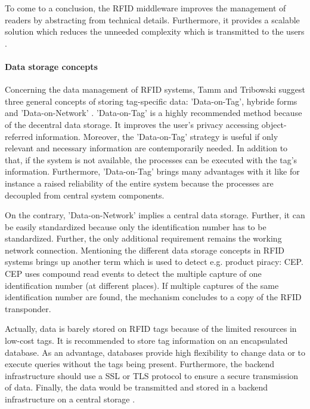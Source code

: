 To come to a conclusion, the RFID middleware improves the management of readers by abstracting from technical details. Furthermore, it provides a scalable solution which reduces the unneeded complexity which is transmitted to the users \cite[p.20 ff.]{fokus}.   

\paragraph{Data storage concepts}

Concerning the data management of RFID systems, Tamm and Tribowski suggest three general concepts of storing tag-specific data: 'Data-on-Tag', hybride forms and 'Data-on-Network' \cite[p.22 ff.]{fokus}. 'Data-on-Tag' is a highly recommended method because of the decentral data storage. It improves the user's privacy accessing object-referred information. Moreover, the 'Data-on-Tag' strategy is useful if only relevant and necessary information are contemporarily needed. In addition to that, if the system is not available, the processes can be executed with the tag's information.
Furthermore, 'Data-on-Tag' brings many advantages with it like for instance a raised reliability of the entire system because the processes are decoupled from central system components. 

On the contrary, 'Data-on-Network' implies a central data storage. Further, it can be easily standardized because only the identification number has to be standardized. Further, the only additional requirement remains the working network connection. Mentioning the different data storage concepts in RFID systems brings up another term which is used to detect e.g. product piracy: \ac{CEP}. CEP uses compound read events to detect the multiple capture of one identification number (at different places). If multiple captures of the same identification number are found, the mechanism concludes to a copy of the RFID transponder. 

Actually, data is barely stored on RFID tags because of the limited resources in low-cost tags. It is recommended \cite{henrici} to store tag information on an encapsulated database. As an advantage, databases provide high flexibility to change data or to execute queries without the tags being present. Furthermore, the backend infrastructure should use a \ac{SSL} or \ac{TLS} protocol to ensure a secure transmission of data. Finally, the data would be transmitted and stored in a backend infrastructure on a central storage \cite{henrici}.

